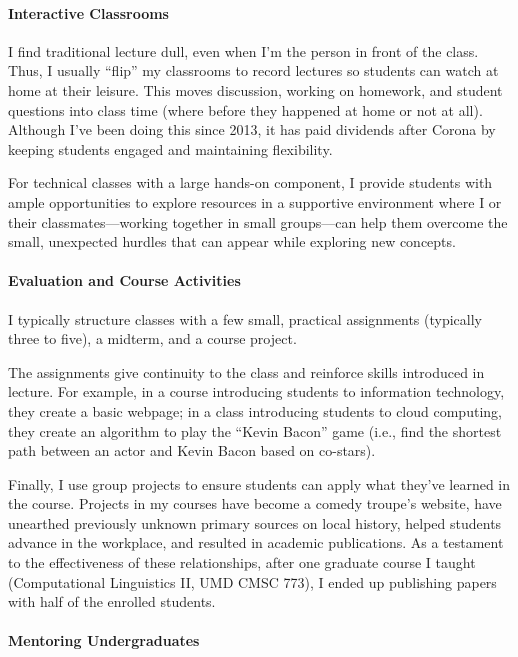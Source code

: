 \documentclass[11pt, amssymb, a4paper, one column]{article}
\begin{document}
\paragraph{Interactive Classrooms}

I find traditional lecture dull, even when I'm the person in front of
the class.  Thus, I usually ``flip'' my classrooms to record
lectures so students can watch at home at their leisure.  This moves
discussion, working on homework, and student questions into class time
(where before they happened at home or not at all).  Although I've
been doing this since 2013, it has paid dividends after Corona by
keeping students engaged and maintaining flexibility.

For technical classes with a large hands-on component, I provide
students with ample opportunities to explore resources in a supportive
environment where I or their classmates---working together in small
groups---can help them overcome the small, unexpected hurdles that can
appear while exploring new concepts.


\paragraph{Evaluation and Course Activities}

I typically structure classes with a few small, practical assignments (typically
three to five), a midterm, and a course project.

The assignments give continuity to the class and reinforce
skills introduced in lecture.  For example, in a course introducing students to information
technology, they create a basic webpage; in a
class introducing students to cloud computing, they create an
algorithm to play the ``Kevin Bacon'' game (i.e., find the shortest path
between an actor and Kevin Bacon based on co-stars).

Finally, I use group projects to ensure students can apply what
they've learned in the course.  Projects in my courses have become a comedy
troupe's website, have unearthed previously unknown primary sources on
local history, helped students advance in the workplace, and resulted
in academic publications.  As a testament to the effectiveness of
these relationships, after one graduate course I taught (Computational
Linguistics II, UMD CMSC 773), I ended up publishing papers with half
of the enrolled students.


\paragraph{Mentoring Undergraduates}
\end{document}
